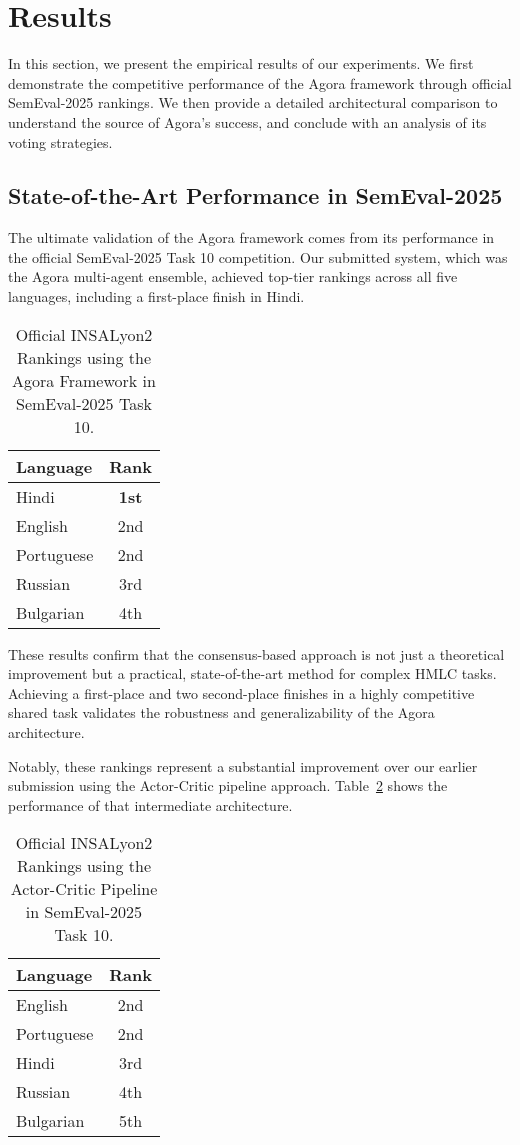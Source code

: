 \section{Results}

In this section, we present the empirical results of our experiments. We first demonstrate the competitive performance of the Agora framework through official SemEval-2025 rankings. We then provide a detailed architectural comparison to understand the source of Agora's success, and conclude with an analysis of its voting strategies.

\subsection{State-of-the-Art Performance in SemEval-2025}

The ultimate validation of the Agora framework comes from its performance in the official SemEval-2025 Task 10 competition. Our submitted system, which was the Agora multi-agent ensemble, achieved top-tier rankings across all five languages, including a first-place finish in Hindi.

\begin{table}[ht]
\centering
\caption{Official INSALyon2 Rankings using the Agora Framework in SemEval-2025 Task 10.}
\label{tab:semeval_rankings}
\begin{tabular}{lc}
\hline
\textbf{Language} & \textbf{Rank} \\
\hline
Hindi & \textbf{1st} \\
English & 2nd \\
Portuguese & 2nd \\
Russian & 3rd \\
Bulgarian & 4th \\
\hline
\end{tabular}
\end{table}

These results confirm that the consensus-based approach is not just a theoretical improvement but a practical, state-of-the-art method for complex HMLC tasks. Achieving a first-place and two second-place finishes in a highly competitive shared task validates the robustness and generalizability of the Agora architecture.

Notably, these rankings represent a substantial improvement over our earlier submission using the Actor-Critic pipeline approach. Table~\ref{tab:actor_critic_rankings} shows the performance of that intermediate architecture.

\begin{table}[ht]
\centering
\caption{Official INSALyon2 Rankings using the Actor-Critic Pipeline in SemEval-2025 Task 10.}
\label{tab:actor_critic_rankings}
\begin{tabular}{lc}
\hline
\textbf{Language} & \textbf{Rank} \\
\hline
English & 2nd \\
Portuguese & 2nd \\
Hindi & 3rd \\
Russian & 4th \\
Bulgarian & 5th \\
\hline
\end{tabular}
\end{table}

